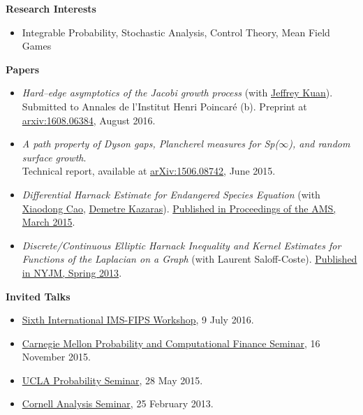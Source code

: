 \documentclass[letterpaper,11pt]{article}
\newcommand{\resheading}[1]{{\large {\textbf{#1 \vphantom{p\^{E}}}}}}
\begin{document}
\resheading{Research Interests}
\begin{itemize}
	\item Integrable Probability, Stochastic Analysis, Control Theory, Mean Field Games
\end{itemize}


\resheading{Papers}

\begin{itemize}
	\item \textit{Hard--edge asymptotics of the Jacobi growth process} (with \href{http://www.math.columbia.edu/~kuan/}{Jeffrey Kuan}). \\Submitted to Annales de l'Institut Henri Poincar\'{e} (b). Preprint at \href{https://arxiv.org/abs/1608.06384}{arxiv:1608.06384}, August 2016.
	\item \textit{A path property of Dyson gaps, Plancherel measures for Sp($\infty$), and random surface growth}. \\ Technical report, available at \href{https://arxiv.org/abs/1506.08742}{arXiv:1506.08742}, June 2015.
  \item \textit{Differential Harnack Estimate for Endangered Species Equation} (with \href{http://www.math.cornell.edu/~cao/}{Xiaodong Cao}, \href{http://pages.uoregon.edu/demetre/}{Demetre Kazaras}). \href{http://www.ams.org/journals/proc/2015-143-10/S0002-9939-2015-12576-2/}{Published in Proceedings of the AMS, March 2015}.
  \item \textit{Discrete/Continuous Elliptic Harnack Inequality and Kernel Estimates for Functions of the Laplacian on a Graph} (with Laurent Saloff-Coste). \href{http://www.emis.de/journals/NYJM/j/2013/19-25.html}{Published in NYJM, Spring 2013}.
\end{itemize}

\resheading{Invited Talks}

\begin{itemize}
	\item \href{http://www.mathfinance2016.com/}{Sixth International IMS-FIPS Workshop}, 9 July 2016. 
	\item \href{http://www.math.cmu.edu/CCF/ccfseminar.php?SeminarSelect=1150}{Carnegie Mellon Probability and Computational Finance Seminar}, 16 November 2015.
	\item \href{https://secure.math.ucla.edu/seminars/display.php?&id=831548}{UCLA Probability Seminar}, 28 May 2015.
	\item \href{http://www.math.cornell.edu/m/node/2088}{Cornell Analysis Seminar}, 25 February 2013.
\end{itemize}
\end{document}
